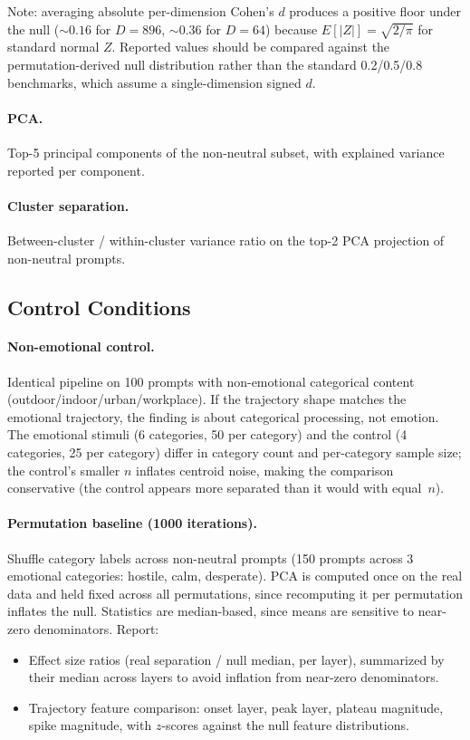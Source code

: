 \documentclass[11pt,a4paper]{article}
\begin{document}
Note: averaging absolute per-dimension Cohen's $d$ produces a positive
floor under the null (${\sim}0.16$ for $D{=}896$, ${\sim}0.36$ for
$D{=}64$) because $E[|Z|] = \sqrt{2/\pi}$ for standard normal $Z$.
Reported values should be compared against the permutation-derived null
distribution rather than the standard 0.2/0.5/0.8 benchmarks, which
assume a single-dimension signed $d$.

\paragraph{PCA.} Top-5 principal components of the non-neutral subset,
with explained variance reported per component.

\paragraph{Cluster separation.} Between-cluster / within-cluster variance
ratio on the top-2 PCA projection of non-neutral prompts.

\subsection{Control Conditions}

\paragraph{Non-emotional control.} Identical pipeline on 100 prompts
with non-emotional categorical content (outdoor/indoor/urban/workplace).
If the trajectory shape matches the emotional trajectory, the finding is
about categorical processing, not emotion. The emotional stimuli (6
categories, 50 per category) and the control (4 categories, 25 per
category) differ in category count and per-category sample size; the
control's smaller $n$ inflates centroid noise, making the comparison
conservative (the control appears more separated than it would with
equal~$n$).

\paragraph{Permutation baseline (1000 iterations).} Shuffle category
labels across non-neutral prompts (150 prompts across 3
emotional categories: hostile, calm, desperate). PCA is computed once on the real data and held
fixed across all permutations, since recomputing it per permutation
inflates the null. Statistics are median-based, since means are
sensitive to near-zero denominators.
Report:
\begin{itemize}[nosep]
    \item Effect size ratios (real separation / null median, per layer),
          summarized by their median across layers to avoid inflation
          from near-zero denominators.
    \item Trajectory feature comparison: onset layer, peak layer,
          plateau magnitude, spike magnitude, with $z$-scores against the
          null feature distributions.
\end{itemize}
\end{document}
